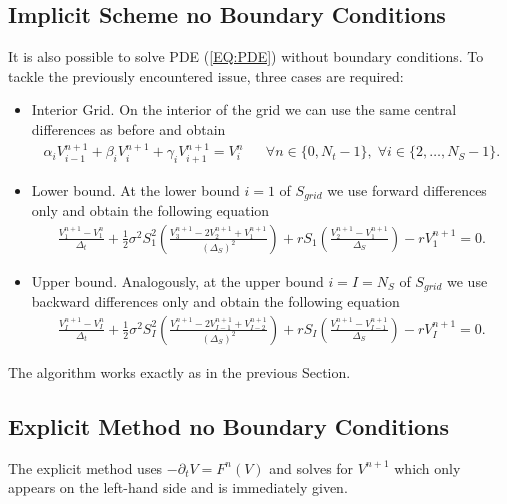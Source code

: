 \documentclass[11pt,a4paper]{article}
\begin{document}
\subsection{Implicit Scheme no Boundary Conditions}
It is also possible to solve PDE (\ref{EQ:PDE}) without boundary conditions. To tackle the previously encountered issue, three cases are required:
\begin{itemize}
\item Interior Grid. On the interior of the grid we can use the same central differences as before and obtain
\begin{align*}
\alpha_i V_{i-1}^{n+1}
 + \beta_i V_i^{n+1} 
 + \gamma_i V_{i+1}^{n+1} = V^n_i && \forall n \in\{0,N_t-1\}, \; \forall i \in \{2,\ldots,N_S-1\}.
\end{align*}

\item Lower bound. At the lower bound $i=1$ of $S_{grid}$ we use forward differences only and obtain the following equation
\begin{align*}
\frac{V_1^{n+1} - V_1^n}{\Delta_t} + \frac{1}{2} \sigma^2 S_1^2 \left( \frac{V_{3}^{n+1} - 2 V_{2}^{n+1} + V_1^{n+1}}{(\Delta_S)^2} \right) + r S_1 \left( \frac{V_{2}^{n+1} - V_1^{n+1}}{\Delta_S} \right) - r V_1^{n+1} = 0.
\end{align*}

\item Upper bound. Analogously, at the upper bound $i=I=N_S$ of $S_{grid}$ we use backward differences only and obtain the following equation
\begin{align*}
\frac{V_I^{n+1} - V_I^n}{\Delta_t} + \frac{1}{2} \sigma^2 S_I^2 \left( \frac{V_I^{n+1} - 2 V_{I-1}^{n+1} + V_{I-2}^{n+1}}{(\Delta_S)^2} \right) + r S_I \left( \frac{V_I^{n+1} - V_{I-1}^{n+1}}{\Delta_S} \right) - r V_I^{n+1} = 0.
\end{align*}
\end{itemize}
The algorithm works exactly as in the previous Section.

\subsection{Explicit Method no Boundary Conditions}

The explicit method uses $-\partial_tV = F^n(V)$ and solves for $V^{n+1}$ which only appears on the left-hand side and is immediately given. 
\end{document}
